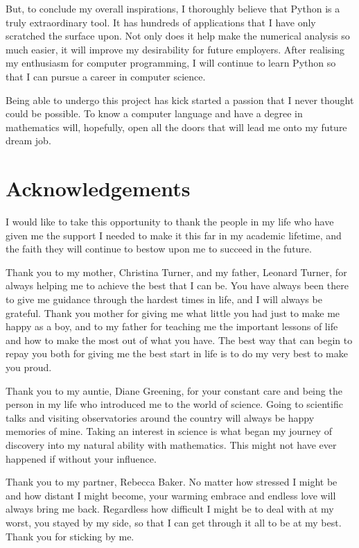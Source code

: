 \documentclass[12pt,twoside]{report}   %
\begin{document}
But, to conclude my overall inspirations, I thoroughly believe that Python is a truly extraordinary tool. It has hundreds of applications that I have only scratched the surface upon. Not only does it help make the numerical analysis so much easier, it will improve my desirability for future employers. After realising my enthusiasm for computer programming, I will continue to learn Python so that I can pursue a career in computer science.

Being able to undergo this project has kick started a passion that I never thought could be possible. To know a computer language and have a degree in mathematics will, hopefully, open all the doors that will lead me onto my future dream job.

\chapter*{Acknowledgements}
\thispagestyle{plain}

I would like to take this opportunity to thank the people in my life who have given me the support I needed to make it this far in my academic lifetime, and the faith they will continue to bestow upon me to succeed in the future. 

Thank you to my mother, Christina Turner, and my father, Leonard Turner, for always helping me to achieve the best that I can be. You have always been there to give me guidance through the hardest times in life, and I will always be grateful. Thank you mother for giving me what little you had just to make me happy as a boy, and to my father for teaching me the important lessons of life and how to make the most out of what you have. The best way that can begin to repay you both for giving me the best start in life is to do my very best to make you proud.

Thank you to my auntie, Diane Greening, for your constant care and being the person in my life who introduced me to the world of science. Going to scientific talks and visiting observatories around the country will always be happy memories of mine. Taking an interest in science is what began my journey of discovery into my natural ability with mathematics. This might not have ever happened if without your influence.

Thank you to my partner, Rebecca Baker. No matter how stressed I might be and how distant I might become, your warming embrace and endless love will always bring me back. Regardless how difficult I might be to deal with at my worst, you stayed by my side, so that I can get through it all to be at my best. Thank you for sticking by me.
\end{document}
